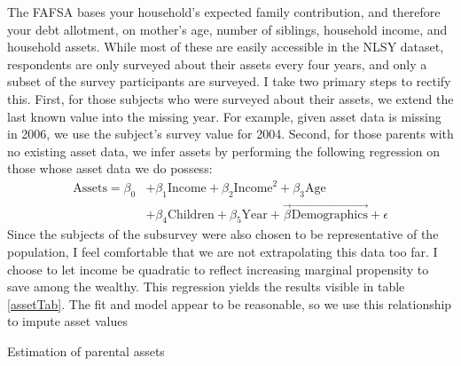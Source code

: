 \documentclass[12pt]{article}
\begin{document}
	The FAFSA bases your household's expected family contribution, and therefore your debt allotment, on mother's age, number of siblings, household income, and household assets. While most of these are easily accessible in the NLSY dataset, respondents are only surveyed about their assets every four years, and only a subset of the survey participants are surveyed. I take two primary steps to rectify this. First, for those subjects who were surveyed about their assets, we extend the last known value into the missing year. For example, given asset data is missing in 2006, we use the subject's survey value for 2004. Second, for those parents with no existing asset data, we infer assets by performing the following regression on those whose asset data we do possess: 
	\begin{equation}
	\begin{aligned}
	\mbox{Assets} = \beta_0 &+ \beta_1 \mbox{Income} + \beta_2 \mbox{Income}^2 + \beta_3 \mbox{Age} \\
	&+ \beta_4 \mbox{Children} + \beta_5 \mbox{Year} + \vec{\beta} \vec{\mbox{Demographics}} + \epsilon
	\end{aligned}
	\end{equation}
	Since the subjects of the subsurvey were also chosen to be representative of the population, I feel comfortable that we are not extrapolating this data too far. I choose to let income be quadratic to reflect increasing marginal propensity to save among the wealthy. This regression yields the results visible in table \ref{assetTab}. The fit and model appear to be reasonable, so we use this relationship to impute asset values
	
	\begin{table}
		\centering
		\caption{Estimation of parental assets}
		
		\label{assetTab}
	\end{table}
\end{document}
